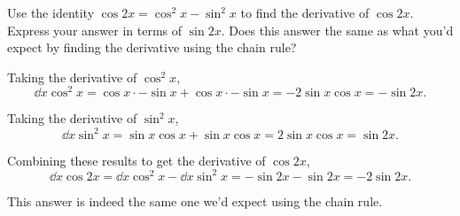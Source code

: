 \begin{example}
	Use the identity $\cos{2x} = \cos^2{x} - \sin^2{x}$ to find the derivative of $\cos{2x}$. Express your answer in terms of $\sin{2x}$. Does this answer the same as what you'd expect by finding the derivative using the chain rule?
\end{example}
\begin{answer}
	Taking the derivative of $\cos^2{x}$,
	\begin{equation*}
		\dd{}{x}\cos^2{x} = \cos{x}\cdot-\sin{x} + \cos{x}\cdot-\sin{x} = -2\sin{x}\cos{x} = -\sin{2x}.
	\end{equation*}
	
	Taking the derivative of $\sin^2{x}$,
	\begin{equation*}
		\dd{}{x}\sin^2{x} = \sin{x}\cos{x} + \sin{x}\cos{x} = 2\sin{x}\cos{x} = \sin{2x}.
	\end{equation*}
	
	Combining these results to get the derivative of $\cos{2x}$,
	\begin{equation*}
		\dd{}{x}\cos{2x} = \dd{}{x}\cos^2{x} - \dd{}{x}\sin^2{x} = -\sin{2x} - \sin{2x} = -2\sin{2x}.
	\end{equation*}
	
	This answer is indeed the same one we'd expect using the chain rule.
\end{answer}